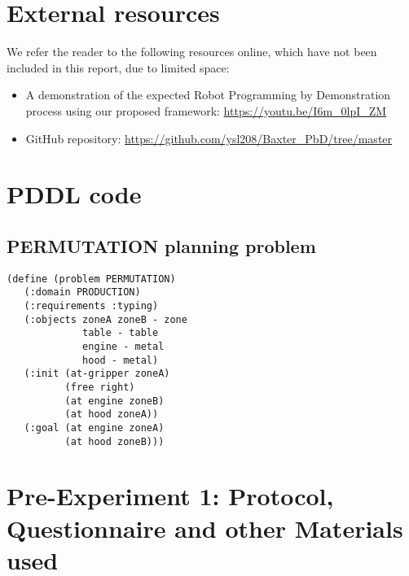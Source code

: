 \chapter{External resources}\label{External resources}
We refer the reader to the following resources online, which have not been included in this report, due to limited space:
\begin{itemize}
\item A demonstration of the expected Robot Programming by Demonstration process using our proposed framework: \url{https://youtu.be/I6m_0lpI_ZM}
\item GitHub repository: \url{https://github.com/ysl208/Baxter_PbD/tree/master}
\end{itemize}

\chapter{PDDL code}\label{app:pddl}
                     
\section{PERMUTATION planning problem}
\begin{verbatim}
(define (problem PERMUTATION)
   (:domain PRODUCTION)
   (:requirements :typing)
   (:objects zoneA zoneB - zone
             table - table
             engine - metal
             hood - metal)
   (:init (at-gripper zoneA)
          (free right)
          (at engine zoneB)
          (at hood zoneA))
   (:goal (at engine zoneA)
          (at hood zoneB)))
\end{verbatim}


\chapter{Pre-Experiment 1: Protocol, Questionnaire and other Materials used}
\label{app:exp1}
%
%
%

